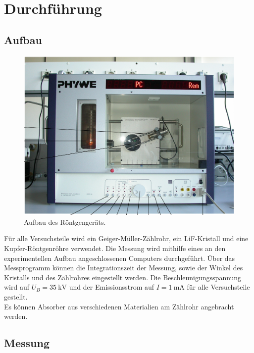 \section{Durchführung}
\label{sec:Durchführung}

\subsection{Aufbau}

\begin{figure}[h!]
    \centering
    \includegraphics[width=\linewidth]{img/Aufbau_V602.png}
    \caption{Aufbau des Röntgengeräts.\cite{V602}}
    \label{fig:Aufbau}
\end{figure}

Für alle Versuchsteile wird ein Geiger-Müller-Zählrohr, ein LiF-Kristall
und eine Kupfer-Röntgenröhre verwendet. Die Messung wird mithilfe eines an den 
experimentellen Aufbau angeschlossenen Computers durchgeführt.
Über das Messprogramm können die Integrationszeit der Messung, sowie der Winkel des Kristalls und des Zählrohres eingestellt werden.
Die Beschleunigungsspannung wird auf $U_B = \SI{35}{\kilo\volt}$ und der Emissionsstrom auf $I = \SI{1}{\milli\ampere}$ für alle Versuchsteile gestellt.\\
Es können Absorber aus verschiedenen Materialien am Zählrohr angebracht werden.\\

\subsection{Messung}


